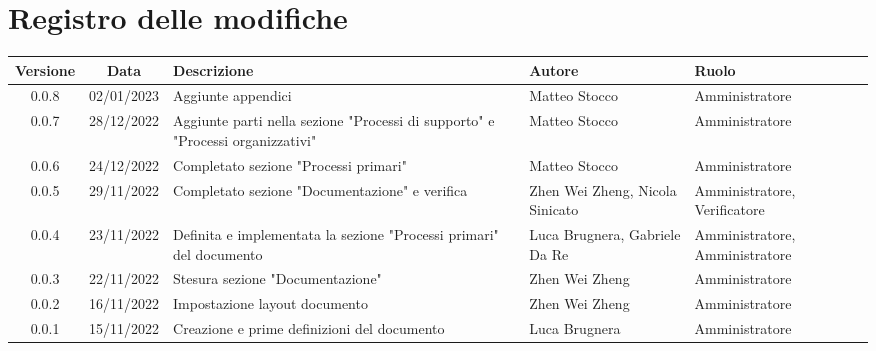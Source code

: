 \section*{Registro delle modifiche}
\begin{center}
\renewcommand\tabularxcolumn[1]{>{\Centering}m{#1}}
\begin{tabularx}{\textwidth}{| c | c | X | X | X |} 
\hline
 \textbf{Versione} & \textbf{Data} & \textbf{Descrizione} & \textbf{Autore} & \textbf{Ruolo}\\
 \hline
 0.0.8 & 02/01/2023 & Aggiunte appendici & Matteo Stocco & Amministratore\\
 \hline
 0.0.7 & 28/12/2022 & Aggiunte parti nella sezione "Processi di supporto" e "Processi organizzativi" & Matteo Stocco & Amministratore\\
 \hline
 0.0.6 & 24/12/2022 & Completato sezione "Processi primari" & Matteo Stocco & Amministratore\\
 \hline
 0.0.5 & 29/11/2022 & Completato sezione "Documentazione" e verifica & Zhen Wei Zheng, Nicola Sinicato & Amministratore, Verificatore\\
 \hline
 0.0.4 & 23/11/2022 &  Definita e implementata la sezione "Processi primari" del documento & Luca Brugnera, Gabriele Da Re & Amministratore, Amministratore\\
 \hline
 0.0.3 & 22/11/2022 & Stesura sezione "Documentazione" & Zhen Wei Zheng & Amministratore\\
 \hline
 0.0.2 & 16/11/2022 & Impostazione layout documento & Zhen Wei Zheng & Amministratore\\
 \hline
 0.0.1 & 15/11/2022 & Creazione e prime definizioni del documento & Luca Brugnera & Amministratore\\
 \hline
\end{tabularx}
\end{center}

